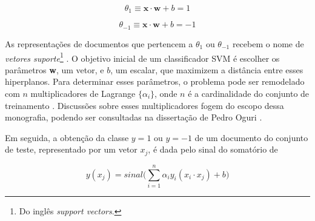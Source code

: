 \begin{equation}
\label{theta1:svm}
\ensuremath{\theta_1 \equiv } \textbf{x} \ensuremath{\cdot} \textbf{w} + \ensuremath{b} = 1
\end{equation}

\begin{equation}
\label{thetamenos1:svm}
\ensuremath{\theta_{-1} \equiv } \textbf{x} \ensuremath{\cdot} \textbf{w} + \ensuremath{b} = -1
\end{equation}

As representações de documentos que pertencem a \ensuremath{\theta_1} ou \ensuremath{\theta_{-1}} recebem o nome de \emph{vetores suporte}\footnote{Do inglês \emph{support vectors}.} \cite{mono-puc}. O objetivo inicial de um classificador SVM é escolher os parâmetros \textbf{w}, um vetor, e \ensuremath{b}, um escalar, que maximizem a distância entre esses hiperplanos. Para determinar esses parâmetros, o problema pode ser remodelado com \ensuremath{n} multiplicadores de Lagrange \ensuremath{\{\alpha_i\}}, onde \ensuremath{n} é a cardinalidade do conjunto de treinamento \cite{mono-puc}. Discussões sobre esses multiplicadores fogem do escopo dessa monografia, podendo ser consultadas na dissertação de Pedro Oguri \cite{mono-puc}. 

Em seguida, a obtenção da classe \ensuremath{y = 1} ou \ensuremath{y = -1} de um documento do conjunto de teste, representado por um vetor \ensuremath{x_j}, é dada pelo sinal do somatório de \cite{mono-puc} 


\begin{equation}
\label{result:svm}
\ensuremath{y(x_j) = sinal\bigg(\sum_{i = 1}^n \alpha_iy_i(x_i \cdot x_j) + b\bigg)} %
\end{equation}







